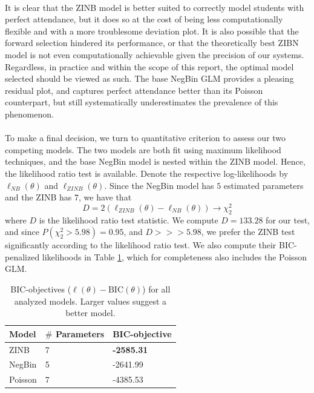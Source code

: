 \documentclass[12pt, titlepage]{article}
\begin{document}
	\paragraph{} It is clear that the ZINB model is better suited to correctly model students with perfect attendance, but it does so at the cost of being less computationally flexible and with a more troublesome deviation plot. It is also possible that the forward selection hindered its performance, or that the theoretically best ZIBN model is not even computationally achievable given the precision of our systems. Regardless, in practice and within the scope of this report, the optimal model selected should be viewed as such. The base NegBin GLM provides a pleasing residual plot, and captures perfect attendance better than its Poisson counterpart, but still systematically underestimates the prevalence of this phenomenon. 
	
	\paragraph{} To make a final decision, we turn to quantitative criterion to assess our two competing models. The two models are both fit using maximum likelihood techniques, and the base NegBin model is nested within the ZINB model. Hence, the likelihood ratio test is available. Denote the respective log-likelihoods by $\ell_{NB}(\theta)$ and $\ell_{ZINB}(\theta)$. Since the NegBin model has $5$ estimated parameters and the ZINB has $7$, we have that
	$$
	D = 2(\ell_{ZINB}(\theta) - \ell_{NB}(\theta)) \to \chi_{2}^2
	$$
	where $D$ is the likelihood ratio test statistic. We compute $D = 133.28$ for our test, and since $P(\chi_{2}^2 > 5.98) = 0.95$, and $D >>> 5.98$, we prefer the ZINB test significantly according to the likelihood ratio test. We also compute their BIC-penalized likelihoods in Table \ref{BIC}, which for completeness also includes the Poisson GLM.
	\begin{table}[h!]
		\centering
		\begin{tabular}{|l|l|l|}
			\hline
			Model & $\#$ Parameters & BIC-objective \\
			\hline 
			ZINB & 7 & \textbf{-2585.31}\\
			NegBin & 5 & -2641.99\\
			Poisson & 7 & -4385.53 \\
			\hline
		\end{tabular}
		\caption{BIC-objectives ($\ell(\theta) - \text{BIC}(\theta)$) for all analyzed models. Larger values suggest a better model.}
		\label{BIC}
	\end{table}
\end{document}
